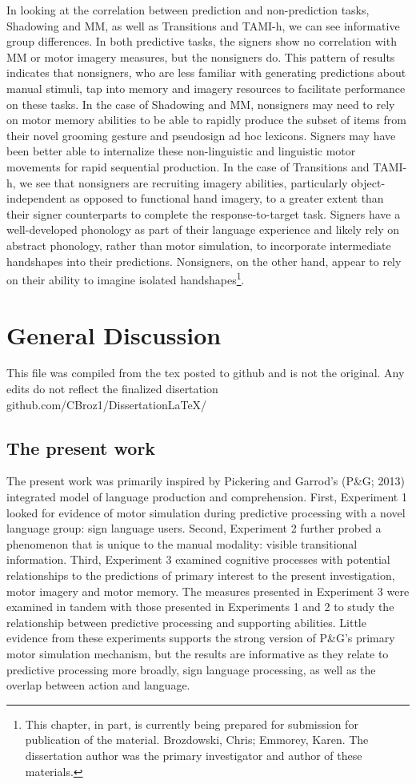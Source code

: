             In looking at the correlation between prediction and non-prediction tasks, Shadowing and MM, as well as Transitions and TAMI-h, we can see informative group differences. In both predictive tasks, the signers show no correlation with MM or motor imagery measures, but the nonsigners do. This pattern of results indicates that nonsigners, who are less familiar with generating predictions about manual stimuli, tap into memory and imagery resources to facilitate performance on these tasks. In the case of Shadowing and MM, nonsigners may need to rely on motor memory abilities to be able to rapidly produce the subset of items from their novel grooming gesture and pseudosign ad hoc lexicons. Signers may have been better able to internalize these non-linguistic and linguistic motor movements for rapid sequential production. In the case of Transitions and TAMI-h, we see that nonsigners are recruiting imagery abilities, particularly object-independent as opposed to functional hand imagery, to a greater extent than their signer counterparts to complete the response-to-target task. Signers have a well-developed phonology as part of their language experience and likely rely on abstract phonology, rather than motor simulation, to incorporate intermediate handshapes into their predictions. Nonsigners, on the other hand, appear to rely on their ability to imagine isolated handshapes\footnote{This chapter, in part, is currently being prepared for submission for publication of the material. Brozdowski, Chris; Emmorey, Karen. The dissertation author was the primary investigator and author of these materials.}.

\section{General Discussion}
    {\tiny This file was compiled from the tex posted to github and is not the original. Any edits do not reflect the finalized disertation
    github.com/CBroz1/DissertationLaTeX/\par}
    \subsection{The present work}
        The present work was primarily inspired by Pickering and Garrod's (P\&G; 2013) integrated model of language production and comprehension. First, Experiment 1 looked for evidence of motor simulation during predictive processing with a novel language group: sign language users. Second, Experiment 2 further probed a phenomenon that is unique to the manual modality: visible transitional information. Third, Experiment 3 examined cognitive processes with potential relationships to the predictions of primary interest to the present investigation, motor imagery and motor memory. The measures presented in Experiment 3 were examined in tandem with those presented in Experiments 1 and 2 to study the relationship between predictive processing and supporting abilities. Little evidence from these experiments supports the strong version of P\&G's primary motor simulation mechanism, but the results are informative as they relate to predictive processing more broadly, sign language processing, as well as the overlap between action and language.\par
